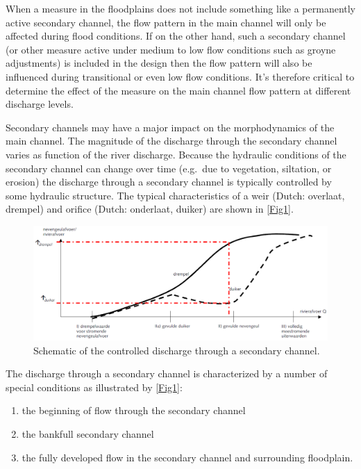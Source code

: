 When a measure in the floodplains does not include something like a permanently active secondary channel, the flow pattern in the main channel will only be affected during flood conditions.
If on the other hand, such a secondary channel (or other measure active under medium to low flow conditions such as groyne adjustments) is included in the design then the flow pattern will also be influenced during transitional or even low flow conditions.
It's therefore critical to determine the effect of the measure on the main channel flow pattern at different discharge levels.

Secondary channels may have a major impact on the morphodynamics of the main channel.
The magnitude of the discharge through the secondary channel varies as function of the river discharge.
Because the hydraulic conditions of the secondary channel can change over time (e.g.~due to vegetation, siltation, or erosion) the discharge through a secondary channel is typically controlled by some hydraulic structure.
The typical characteristics of a weir (Dutch: overlaat, drempel) and orifice (Dutch: onderlaat, duiker) are shown in \autoref{Fig1}.

\begin{figure}[b]
\includegraphics[width=\columnwidth]{figures/Fig1.png}
\caption{Schematic of the controlled discharge through a secondary channel.}
\label{Fig1}
\end{figure}

The discharge through a secondary channel is characterized by a number of special conditions as illustrated by \autoref{Fig1}:

\begin{enumerate}
\item the beginning of flow through the secondary channel
\item the bankfull secondary channel
\item the fully developed flow in the secondary channel and surrounding floodplain.
\end{enumerate}

